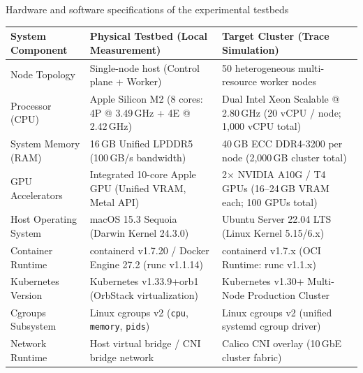 \begin{table}[ht]{Hardware and software specifications of the experimental testbeds}
\label{tab:testbed_specifications}
\centering
\small
\begin{tabular}{p{3.8cm}p{5.4cm}p{5.8cm}}
\toprule
System Component & Physical Testbed (Local Measurement) & Target Cluster (Trace Simulation) \\
\midrule
Node Topology & Single-node host (Control plane + Worker) & 50 heterogeneous multi-resource worker nodes \\
Processor (CPU) & Apple Silicon M2 (8 cores: 4P @ 3.49\,GHz + 4E @ 2.42\,GHz) & Dual Intel Xeon Scalable @ 2.80\,GHz (20 vCPU / node; 1,000 vCPU total) \\
System Memory (RAM) & 16\,GB Unified LPDDR5 (100\,GB/s bandwidth) & 40\,GB ECC DDR4-3200 per node (2,000\,GB cluster total) \\
GPU Accelerators & Integrated 10-core Apple GPU (Unified VRAM, Metal API) & 2$\times$ NVIDIA A10G / T4 GPUs (16--24\,GB VRAM each; 100 GPUs total) \\
Host Operating System & macOS 15.3 Sequoia (Darwin Kernel 24.3.0) & Ubuntu Server 22.04 LTS (Linux Kernel 5.15/6.x) \\
Container Runtime & containerd v1.7.20 / Docker Engine 27.2 (runc v1.1.14) & containerd v1.7.x (OCI Runtime: runc v1.1.x) \\
Kubernetes Version & Kubernetes v1.33.9+orb1 (OrbStack virtualization) & Kubernetes v1.30+ Multi-Node Production Cluster \\
Cgroups Subsystem & Linux cgroups v2 (\texttt{cpu}, \texttt{memory}, \texttt{pids}) & Linux cgroups v2 (unified systemd cgroup driver) \\
Network Runtime & Host virtual bridge / CNI bridge network & Calico CNI overlay (10\,GbE cluster fabric) \\
\bottomrule
\end{tabular}
\end{table}
